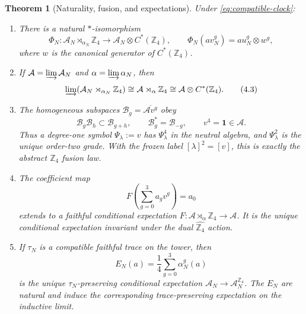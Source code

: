 \documentclass[11pt]{article}
\newtheorem{theorem}{Theorem}[section]
\theoremstyle{remark}
\newcommand{\id}{\mathbf 1}
\newcommand{\A}{\mathcal A}
\begin{document}
\begin{theorem}[Naturality, fusion, and expectations]
\label{thm:crossed}
Under \eqref{eq:compatible-clock}:
\begin{enumerate}[label=\textup{(\alph*)}]
\item There is a natural $*$-isomorphism
\[
 \Phi_N:\A_N\rtimes_{\alpha_N}\mathbb Z_4
 \longrightarrow
 \A_N\otimes C^*(\mathbb Z_4),
\qquad
 \Phi_N(av_N^g)=au_N^g\otimes w^g,
\tag{4.2}\label{eq:phi}
\]
where $w$ is the canonical generator of $C^*(\mathbb Z_4)$.
\item If $\A=\varinjlim\A_N$ and $\alpha=\varinjlim\alpha_N$, then
\[
 \varinjlim(\A_N\rtimes_{\alpha_N}\mathbb Z_4)
 \cong\A\rtimes_\alpha\mathbb Z_4
 \cong\A\otimes C^*(\mathbb Z_4).
\tag{4.3}\label{eq:limit-crossed}
\]
\item The homogeneous subspaces
$\mathcal B_g=\overline{\A v^g}$ obey
\[
 \mathcal B_g\mathcal B_h\subset\mathcal B_{g+h},
\qquad
\mathcal B_g^*=\mathcal B_{-g},
\qquad
v^4=\id\in\A.
\tag{4.4}\label{eq:fusion}
\]
Thus a degree-one symbol $\Psi_\lambda:=v$ has
$\Psi_\lambda^4$ in the neutral algebra, and
$\Psi_\lambda^2$ is the unique order-two grade.  With the frozen label
$[\lambda]^2=[v]$, this is exactly the abstract $\mathbb Z_4$ fusion
law.
\item The coefficient map
\[
 F\left(\sum_{g=0}^3a_gv^g\right)=a_0
\tag{4.5}\label{eq:coefficient-expectation}
\]
extends to a faithful conditional expectation
$F:\A\rtimes_\alpha\mathbb Z_4\to\A$.  It is the unique conditional
expectation invariant under the dual $\widehat{\mathbb Z_4}$ action.
\item If $\tau_N$ is a compatible faithful trace on the tower, then
\[
 E_N(a)=\frac14\sum_{g=0}^3\alpha_N^g(a)
\tag{4.6}\label{eq:average-expectation}
\]
is the unique $\tau_N$-preserving conditional expectation
$\A_N\to\A_N^{\mathbb Z_4}$.  The $E_N$ are natural and induce the
corresponding trace-preserving expectation on the inductive limit.
\end{enumerate}
\end{theorem}
\end{document}
